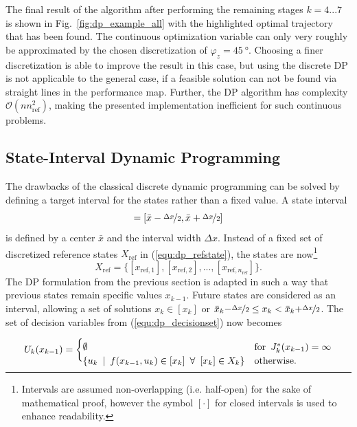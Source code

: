 \documentclass[runningheads]{llncs}
\begin{document}
The final result of the algorithm after performing the remaining stages $k=4...7$ is shown in Fig.~\ref{fig:dp_example_all} with the highlighted optimal trajectory that has been found.
The continuous optimization variable can only very roughly be approximated by the chosen discretization of $\varphi_{z} = \SI{45}{\degree}$.
Choosing a finer discretization is able to improve the result in this case, but using the discrete DP is not applicable to the general case, if a feasible solution can not be found via straight lines in the performance map.
Further, the DP algorithm has complexity $\mathcal{O}(n n_{\mathrm{ref}}^2)$, making the presented implementation inefficient for such continuous problems.


\subsection{State-Interval Dynamic Programming}
\label{sec:trajopt_dp_interval}

The drawbacks of the classical discrete dynamic programming can be solved by defining a target interval for the states rather than a fixed value.
A state interval 
\begin{equation}
[x] = [\bar{x}-\nicefrac{\Delta x}{2}, \bar{x}+\nicefrac{\Delta x}{2}]
\end{equation}
is defined by a center $\bar{x}$ and the interval width $\Delta x$.
Instead of a fixed set of discretized reference states $X_\mathrm{ref}$ in (\ref{equ:dp_refstate}), the states are now\footnote{Intervals are assumed non-overlapping (i.e. half-open) for the sake of mathematical proof, however the symbol $[\cdot]$ for closed intervals is used to enhance readability.} 
\begin{equation}
X_\mathrm{ref}=
\{
[x_{\mathrm{ref},1}],[x_{\mathrm{ref},2}],...,[x_{\mathrm{ref},n_{\mathrm{ref}}}]
\}.
\end{equation}
The DP formulation from the previous section is adapted in such a way that previous states remain specific values $x_{k-1}$.
Future states are considered as an interval, allowing a set of solutions $x_{k} \in [x_{k}]$ or $\bar{x}_{k}{-}\nicefrac{\Delta x}{2} \le x_{k} < \bar{x}_{k}{+}\nicefrac{\Delta x}{2}$.
%
The set of decision variables from (\ref{equ:dp_decisionset}) now becomes

\begin{equation}
U_k(x_{k-1}) = 
\begin{cases} 
\emptyset & \mathrm{for} \enspace  J^*_{k}(x_{k-1}) = \infty \\
\{ u_k 
\enspace | \enspace 
f(x_{k-1},u_k) \in [x_k] 
\enspace \forall \enspace 
[x_k] \in X_k
\}
& \mathrm {otherwise.} \vspace{-0.3cm} %
\end{cases}
\label{equ:idp_decisionset}
\vspace{0.2cm} %
\end{equation}
\end{document}

